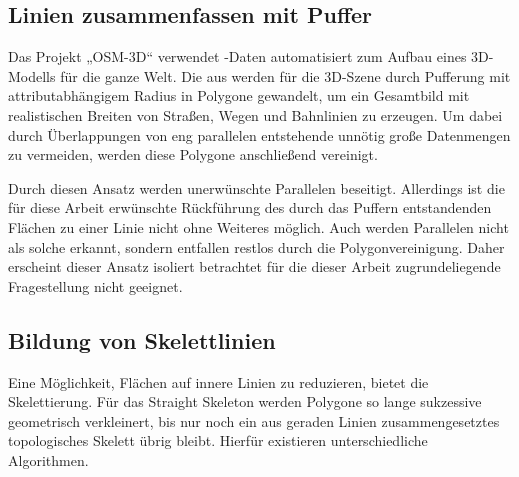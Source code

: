 \documentclass[../main/thesis.tex]{subfiles}
\begin{document}
\subsection{Linien zusammenfassen mit Puffer}
\label{ch:buffer}

Das Projekt „OSM-3D“ verwendet \osm-Daten automatisiert zum Aufbau eines 3D-Modells für die ganze Welt.
Die  aus \osm{} werden für die 3D-Szene durch Pufferung mit attributabhängigem Radius in Polygone gewandelt, um ein Gesamtbild mit realistischen Breiten von Straßen, Wegen und Bahnlinien zu erzeugen.
Um dabei durch Überlappungen von eng parallelen  entstehende unnötig große Datenmengen zu vermeiden, werden diese Polygone anschließend vereinigt. 

Durch diesen Ansatz werden unerwünschte Parallelen beseitigt.
Allerdings ist die für diese Arbeit erwünschte Rückführung des durch das Puffern entstandenden Flächen zu einer Linie nicht ohne Weiteres möglich.
Auch werden Parallelen nicht als solche erkannt, sondern entfallen restlos durch die Polygonvereinigung.
Daher erscheint dieser Ansatz isoliert betrachtet für die dieser Arbeit zugrundeliegende Fragestellung nicht geeignet.


\subsection{Bildung von Skelettlinien}
\label{ch:skeleton}

Eine Möglichkeit, Flächen auf innere Linien zu reduzieren, bietet die Skelettierung.
Für das Straight Skeleton werden Polygone so lange sukzessive geometrisch verkleinert, bis nur noch ein aus geraden Linien zusammengesetztes topologisches Skelett übrig bleibt.
Hierfür existieren unterschiedliche Algorithmen. 
\end{document}
